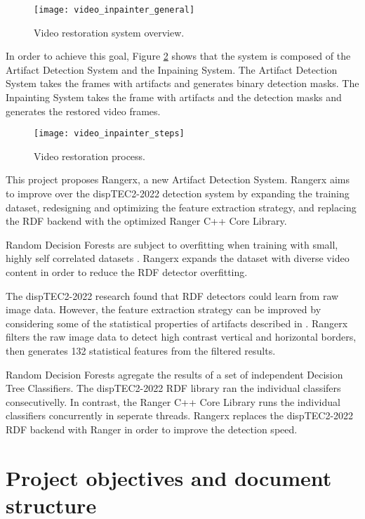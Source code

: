 \begin{figure} [!h]
  \centering
  
  \texttt{[image: video\_inpainter\_general]}
  
  \caption{Video restoration system overview.}
  \label{fig:restoration_system_overview}

\end{figure}

In order to achieve this goal, Figure \ref{fig:restoration_system_steps} shows that the system is composed of the Artifact Detection System and the Inpaining System. The Artifact Detection System takes the frames with artifacts and generates binary detection masks. The Inpainting System takes the frame with artifacts and the detection masks and generates the restored video frames.

\begin{figure} [!h]
  \centering
  
  \texttt{[image: video\_inpainter\_steps]}
  
  \caption{Video restoration process. }
  \label{fig:restoration_system_steps}

\end{figure}

This project proposes Rangerx, a new Artifact Detection System. Rangerx aims to improve over the dispTEC2-2022 detection system by expanding the training dataset, redesigning and optimizing the feature extraction strategy, and replacing the RDF backend with the optimized Ranger C++ Core Library.

Random Decision Forests are subject to overfitting when training with small, highly self correlated datasets \cite{Breiman2001}. Rangerx expands the dataset with diverse video content in order to reduce the RDF detector overfitting.

The dispTEC2-2022 research found that RDF detectors could learn from raw image data. However, the feature extraction strategy can be improved by considering some of the statistical properties of artifacts described in \cite{Vranjes2019, Glavota2018}. Rangerx filters the raw image data to detect high contrast vertical and horizontal borders, then generates 132 statistical features from the filtered results.

Random Decision Forests agregate the results of a set of independent Decision Tree Classifiers. The dispTEC2-2022 RDF library ran the individual classifers consecutivelly. In contrast, the Ranger C++ Core Library runs the individual classifiers concurrently in seperate threads. Rangerx replaces the dispTEC2-2022 RDF backend with Ranger in order to improve the detection speed.

\section{Project objectives and document structure}
\label{sec:intro_objectives}
